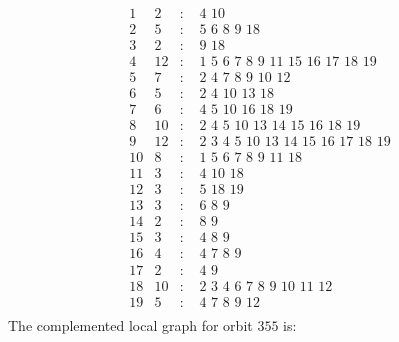 \documentclass[12pt]{article}
\begin{document}
\begin{equation*}
\begin{array}{rrcl}
1&2&:&\,\,4\,\,10\\
2&5&:&\,\,5\,\,6\,\,8\,\,9\,\,18\\
3&2&:&\,\,9\,\,18\\
4&12&:&\,\,1\,\,5\,\,6\,\,7\,\,8\,\,9\,\,11\,\,15\,\,16\,\,17\,\,18\,\,19\\
5&7&:&\,\,2\,\,4\,\,7\,\,8\,\,9\,\,10\,\,12\\
6&5&:&\,\,2\,\,4\,\,10\,\,13\,\,18\\
7&6&:&\,\,4\,\,5\,\,10\,\,16\,\,18\,\,19\\
8&10&:&\,\,2\,\,4\,\,5\,\,10\,\,13\,\,14\,\,15\,\,16\,\,18\,\,19\\
9&12&:&\,\,2\,\,3\,\,4\,\,5\,\,10\,\,13\,\,14\,\,15\,\,16\,\,17\,\,18\,\,19\\
10&8&:&\,\,1\,\,5\,\,6\,\,7\,\,8\,\,9\,\,11\,\,18\\
11&3&:&\,\,4\,\,10\,\,18\\
12&3&:&\,\,5\,\,18\,\,19\\
13&3&:&\,\,6\,\,8\,\,9\\
14&2&:&\,\,8\,\,9\\
15&3&:&\,\,4\,\,8\,\,9\\
16&4&:&\,\,4\,\,7\,\,8\,\,9\\
17&2&:&\,\,4\,\,9\\
18&10&:&\,\,2\,\,3\,\,4\,\,6\,\,7\,\,8\,\,9\,\,10\,\,11\,\,12\\
19&5&:&\,\,4\,\,7\,\,8\,\,9\,\,12\\
\end{array}
\end{equation*}
The complemented local graph for orbit $355$ is:
\end{document}
